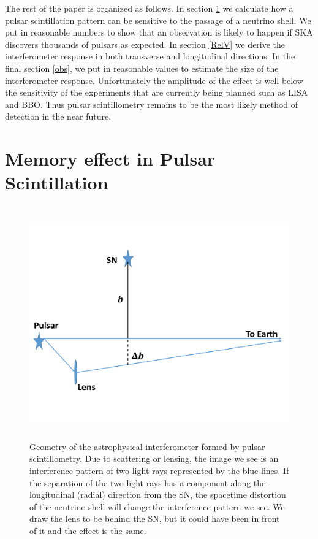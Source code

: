 \documentclass[aps,showpacs,onecolumn,floats,prd,superscriptaddress,nofootinbib]{revtex4-1}
\begin{document}
The rest of the paper is organized as follows. 
In section \ref{sec-scint} we calculate how a pulsar scintillation pattern can be sensitive to the passage of a neutrino shell.
We put in reasonable numbers to show that an observation is likely to happen if SKA discovers thousands of pulsars as expected.
In section \ref{RelV} we derive the interferometer response in both transverse and longitudinal directions.  
In the final section \ref{obs}, we put in reasonable values to estimate the size of the interferometer response.
Unfortunately the amplitude of the effect is well below the sensitivity of the experiments that are currently being planned such as LISA and BBO.
Thus pulsar scintillometry remains to be the most likely method of detection in the near future.

\section{Memory effect in Pulsar Scintillation}
\label{sec-scint}

\begin{figure}[t!]
\begin{center}
\includegraphics[width=\textwidth,height=10cm]{Lens.pdf}
\caption{Geometry of the astrophysical interferometer formed by pulsar scintillometry. Due to scattering or lensing, the image we see is an interference pattern of two light rays represented by the blue lines. If the separation of the two light rays has a component along the longitudinal (radial) direction from the SN, the spacetime distortion of the neutrino shell will change the interference pattern we see. We draw the lens to be behind the SN, but it could have been in front of it and the effect is the same.}
\label{fig:4}
\end{center}
\end{figure}
\end{document}
